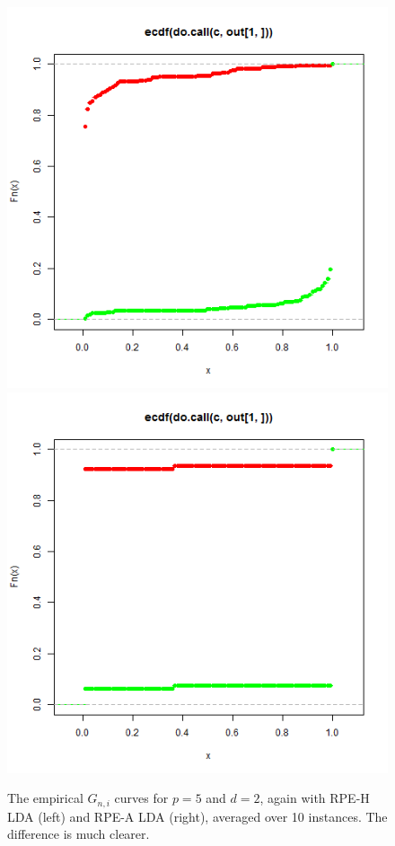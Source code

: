 \documentclass[ejs,preprint]{imsart}
\begin{document}
\begin{figure}
\begin{centering}
\includegraphics[scale=0.35]{G_ni_mini}\includegraphics[scale=0.35]{G_ni_mini_axis}
\par\end{centering}

\caption{The empirical $G_{n,i}$ curves for $p=5$
and $d=2$, again with RPE-H LDA (left) and RPE-A LDA (right), averaged
over 10 instances. The difference is much clearer.}


\label{fig:mini-run-g-curves}
\end{figure}
\end{document}
